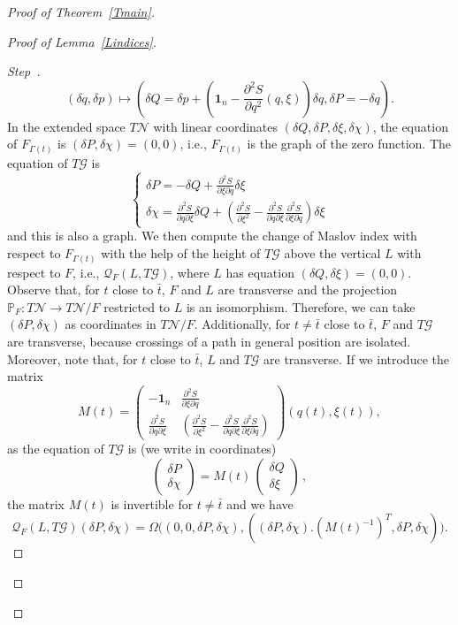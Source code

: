 \documentclass[10pt,a4paper]{amsart}
\numberwithin{equation}{section}
\newcommand*\cq{\mathcal{Q}}
\newcommand*\cg{\mathcal{G}}
\newcommand*\cN{\mathcal{N}}
\newcommand*\cal{\mathcal}
\newcommand{\bfone}{\mathbf{1}}
\newcommand{\bbP}{\mathbb{P}}
\newcounter{stepcount}
\newenvironment{step}{\refstepcounter{stepcount}\begin{proof}[Step~\thestepcount]}{\let\qed\relax\end{proof}}
\theoremstyle{definition}
\theoremstyle{remark}
\begin{document}
\begin{proof}[Proof of Theorem~\ref{Tmain}]
\begin{proof}[Proof of Lemma~\ref{Lindices}]
\begin{step}
\[
(\delta q, \delta p)\mapsto \left(\delta Q=\delta p+\left(\bfone_n-\frac{\partial^2 S}{\partial q^2}(q, \xi)\right)\delta q, \delta P=-\delta q\right).
\]
In the extended space $T\cN$ with linear coordinates $(\delta Q, \delta P, \delta \xi, \delta \chi)$, the equation of $F_{\Gamma(t)}$ is $(\delta P, \delta\chi)=(0, 0)$, i.e., $F_{\Gamma(t)}$ is the graph of the zero function. The equation of $T\cg$ is
\begin{equation}\label{ETG}
\begin{cases}\delta P=-\delta Q+\frac{\partial^2S}{\partial \xi\partial q}\delta \xi\\
\delta \chi=\frac{\partial^2 S}{\partial q\partial \xi} \delta Q+\left(\frac{\partial ^2S}{\partial \xi^2} -\frac{\partial^2 S}{\partial q\partial \xi} \frac{\partial^2S}{\partial\xi\partial q} \right)\delta \xi
\end{cases}
\end{equation}
and this is also a graph. We then compute the change of Maslov index with respect to $F_{\Gamma(t)}$ with the help of the height of $T\cg$ above the vertical $L$ with respect to $F$, {i.e., $\cal Q_F(L,T\cg)$,} where $L$ has equation $(\delta Q, \delta\xi)=(0, 0)$. {Observe that, for $t$ close to $\bar t$}, $F$ and $L$ are transverse and the projection $\bbP_F:T\cN \rightarrow T\cN/F$ restricted to $L$ is an isomorphism. Therefore, we can take $(\delta P, \delta \chi)$ as coordinates in $T\cN/F$. Additionally, for $t\not=\bar t$ close to $\bar t$, $F$ and $T\cg$ are transverse, because crossings of a path in general position are isolated. Moreover, note that, for $t$ close to $\bar t$, $L$ and $T\cg$ are transverse. If we introduce the matrix
\begin{equation}
M(t)=
\begin{pmatrix} -\bfone_n & \frac{\partial^2 S}{\partial\xi\partial q}\\
\frac{\partial^2 S}{\partial q\partial \xi} & \left(\frac{\partial ^2S}{\partial \xi^2}-\frac{\partial^2 S}{\partial q\partial \xi}\frac{\partial^2S}{\partial\xi\partial q}\right)
\end{pmatrix}(q(t), \xi(t)),
\end{equation}
as the equation of $T\cg$ is (we write in coordinates)
\[
\begin{pmatrix}
\delta P \\ \delta \chi
\end{pmatrix} = M(t)\,
\begin{pmatrix}
\delta Q \\ \delta \xi
\end{pmatrix}\,,
\]
the matrix $M(t)$ is invertible for $t\not=\bar t$ and we have
\[
\cq_F(L, T\cg)(\delta P, \delta\chi)=\Omega\Big((0,0,\delta P, \delta \chi), \left((\delta P,\delta\chi).\left(M(t)^{-1}\right)^T, \delta P, \delta\chi\right)\Big).
\]


\end{step}
\end{proof}
\end{proof}
\end{document}
